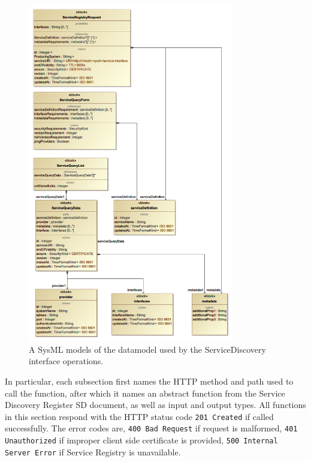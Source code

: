 \documentclass[a4paper]{arrowhead}
\begin{document}
\begin{figure}[ht!]
  \centering
  \includegraphics[width=0.8\textwidth]{figures/ServiceDiscovery-datamodels}
  \caption{A SysML models of the datamodel used by the
    ServiceDiscovery interface operations. }
  \label{fig:ServiceDiscovery-datamodels}
\end{figure}

In particular, each subsection first names the HTTP method and path used to call the function, after which it names an abstract function from the Service Discovery Register SD document, as well as input and output types.
All functions in this section respond with the HTTP status code \texttt{201 Created} if called successfully. The error codes are, \texttt{400 Bad Request} if request is malformed, \texttt{401 Unauthorized} if improper client side certificate is provided, \texttt{500 Internal Server Error} if Service Registry is unavailable.

\end{document}
